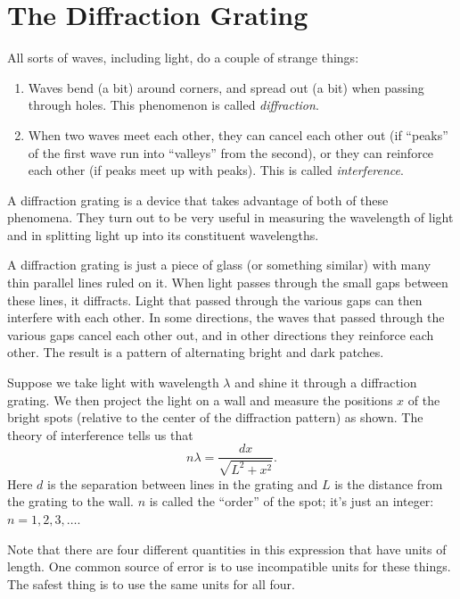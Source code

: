 \section{The Diffraction Grating}

\makelabheader

\answerspace{1in}

All sorts of waves, including light, do a couple 
of strange things:
\begin{enumerate}
\item Waves bend (a bit) around corners, and spread
out (a bit) when passing through holes. 
This phenomenon is called {\it diffraction}.
\item When two waves meet each other, they
can cancel each other out (if ``peaks'' of the
first wave run into ``valleys'' from the second), 
or they can reinforce each other (if peaks meet up with peaks).
This is called {\it interference}.
\end{enumerate}

A diffraction grating is a device
that takes advantage of both of these phenomena.  They turn
out to be very useful in measuring the wavelength
of light and in splitting light up into its constituent
wavelengths.  

A diffraction grating is just a piece of glass (or something similar)
with many thin parallel lines ruled on it.  When light passes through
the small gaps between these lines, it diffracts.  Light that passed
through the various gaps can then interfere with each other.  In some
directions, the waves that passed through the various gaps cancel each
other out, and in other directions they reinforce each other.  The
result is a pattern of alternating bright and dark patches.

Suppose we take light with wavelength $\lambda$ and
shine it through a diffraction grating.  We then
project the light on a wall and measure the 
positions $x$ of the bright spots (relative to the
center of the diffraction pattern) as shown.  The theory of 
interference tells us that 
\begin{displaymath} n\lambda = \frac{dx}{ \sqrt{L^2+x^2}}.  \end{displaymath}
Here $d$ is the separation between lines in the grating and $L$
is the distance from the grating to the wall.  $n$ is called the
``order'' of the spot; it's just an integer: $n=1,2,3,\ldots$.

Note that there are four different quantities in this expression that
have units of length.  One common source of error is to
use incompatible units for these things.  The safest thing is
to use the same units for all four.

